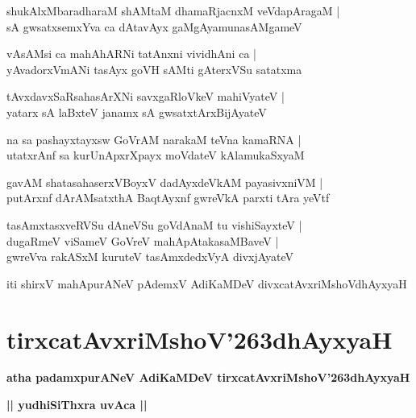\documentclass[twoside,12pt,openright]{book}
\def\S{\char'263}
\newcounter{shloka}[chapter]
\def\uvaca#1{\centerline{{\large\textbf{#1}}}}
\begin{document}
\begin{shloka}
shukAlxMbaradharaM shAMtaM dhamaRjacnxM veVdapAragaM |\\
sA gwsatxsemxYva ca dAtavAyx gaMgAyamunasAMgameV 
\end{shloka}

\begin{shloka}
vAsAMsi ca mahAhARNi tatAnxni vividhAni ca |\\
yAvadorxVmANi tasAyx goVH sAMti gAterxVSu satatxma 
\end{shloka}

\begin{shloka}
tAvxdavxSaRsahasArXNi savxgaRloVkeV mahiVyateV |\\
yatarx sA laBxteV janamx sA gwsatxtArxBijAyateV 
\end{shloka}

\begin{shloka}
na sa pashayxtayxsw GoVrAM narakaM teVna kamaRNA |\\
utatxrAnf sa kurUnApxrXpayx moVdateV kAlamukaSxyaM 
\end{shloka}

\begin{shloka}
gavAM shatasahaserxVBoyxV dadAyxdeVkAM payasivxniVM |\\
putArxnf dArAMsatxthA BaqtAyxnf gwreVkA parxti tAra yeVtf 
\end{shloka}

\begin{shloka}
tasAmxtasxveRVSu dAneVSu goVdAnaM tu vishiSayxteV |\\
dugaRmeV viSameV GoVreV mahApAtakasaMBaveV |\\
gwreVva rakASxM kuruteV tasAmxdedxVyA divxjAyateV
\end{shloka}

\begin{center}
iti shirxV mahApurANeV pAdemxV AdiKaMDeV divxcatAvxriMshoVdhAyxyaH
\end{center}

\chapter{tirxcatAvxriMshoV\S dhAyxyaH}

\begin{center}
{\LARGE\bfseries atha padamxpurANeV AdiKaMDeV tirxcatAvxriMshoV\S dhAyxyaH}
\end{center}

\uvaca{|| yudhiSiThxra uvAca ||}
\end{document}
